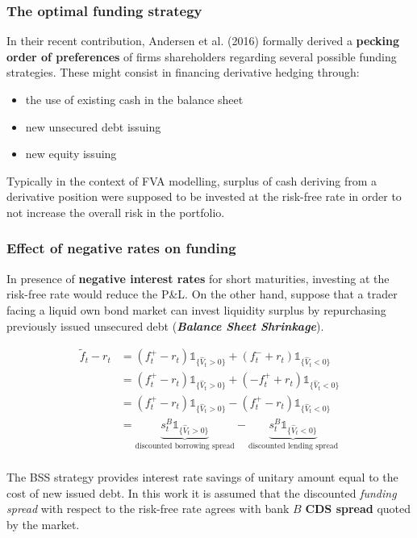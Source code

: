 \documentclass{beamer}
\begin{document}
\begin{frame}
\frametitle{The optimal funding strategy}
	In their recent contribution, Andersen et al. (2016) formally derived a \textbf{pecking order of preferences} of firms shareholders regarding several possible funding strategies. These might consist in financing derivative hedging through:
	\begin{itemize}
		\item the use of existing cash in the balance sheet
		
		\item new unsecured debt issuing
				
		\item new equity issuing
	\end{itemize}

	Typically in the context of FVA modelling, surplus of cash deriving from a derivative position were supposed to be invested at the risk-free rate in order to not increase the overall risk in the portfolio. 
\end{frame}

\begin{frame}
\frametitle{Effect of negative rates on funding}

	In presence of \textbf{negative interest rates} for short maturities, investing at the risk-free rate would reduce the P\&L. On the other hand, suppose that a trader facing a liquid own bond market can invest liquidity surplus by repurchasing previously issued unsecured debt (\textbf{\emph{Balance Sheet Shrinkage}}).

	\footnotesize{
	\begin{equation}	
	\begin{split}
	\tilde{f}_{t} - r_{t} &= (f^{+}_{t}-r_t)\mathds{1}_{ \{ \hat{V}_{t}>0 \} } + (f^{-}_{t}+r_t)\mathds{1}_{ \{\hat{V}_{t}<0 \}}\\
	&= (f^{+}_{t}-r_t)\mathds{1}_{ \{ \hat{V}_{t}>0 \} } + (-f^{+}_{t}+r_t)\mathds{1}_{ \{\hat{V}_{t}<0 \}}\\
	&= (f^{+}_{t}-r_t)\mathds{1}_{ \{ \hat{V}_{t}>0 \} } - (f^{+}_{t}-r_t)\mathds{1}_{ \{\hat{V}_{t}<0 \}}\\
	&=\underbrace{ s^{B}_t\mathds{1}_{ \{ \hat{V}_{t}>0 \} } }_{\text{discounted borrowing spread}}- \underbrace{s^{B}_t\mathds{1}_{ \{\hat{V}_{t}<0 \}}}_{\text{discounted lending spread}}\\
	\end{split}
	\end{equation}
	}

	
	The BSS strategy provides interest rate savings of  unitary amount equal to the cost of new issued debt. In this work it is assumed that the discounted \emph{funding spread} with respect to the risk-free rate agrees with bank $B$  \textbf{CDS spread} quoted by the market. 
\end{frame}
\end{document}
